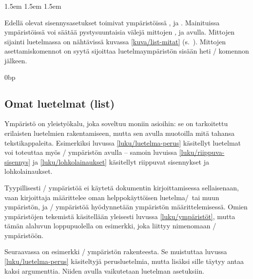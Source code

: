 \begin{koodilohkosis}
\setlength{\leftmargini}  {1.5em} %
\setlength{\leftmarginii} {1.5em}
\setlength{\leftmarginiii}{1.5em}
\setlength{\leftmarginiv} {1.5em}
\end{koodilohkosis}

\noindent
Edellä olevat sisennysasetukset toimivat ympäristöissä
,  ja .
Mainituissa ympäristöissä voi säätää pystysuuntaisia välejä mittojen
,  ja  avulla. Mittojen
sijainti luetelmassa on nähtävissä kuvassa \ref{kuva/list-mitat}
(s.~\pageref{kuva/list-mitat}). Mittojen asettamiskomennot on syytä
sijoittaa luetelmaympäristön sisään heti \-/ komennon
jälkeen.

\begin{koodilohkosis}
\setlength{\parsep} {0bp}   %
\setlength{\itemsep}{3bp}   %
\setlength{\parskip}{1.2ex} %
\end{koodilohkosis}

\subsection{Omat luetelmat (list)}
\label{luku/list-ympäristö}

Ympäristö  on yleistyökalu, joka soveltuu moniin
asioihin: se on tarkoitettu erilaisten luetelmien rakentamiseen, mutta
sen avulla muotoilla mitä tahansa tekstikappaleita. Esimerkiksi luvussa
\ref{luku/luetelma-perus} käsitellyt luetelmat voi toteuttaa myös
\-/ ympäristön avulla -- samoin luvuissa
\ref{luku/riippuva-sisennys} ja \ref{luku/lohkolainaukset} käsitellyt
riippuvat sisennykset ja lohkolainaukset.

Tyypillisesti \-/ ympäristöä ei käytetä dokumentin
kirjoittamisessa sellaisenaan, vaan kirjoittaja määrittelee oman
helppokäyttöisen luetelma\-/\ tai muun ympäristön, ja
\-/ ympäristöä hyödynnetään ympäristön
määrittelemisessä. Omien ympäristöjen tekemistä käsitellään yleisesti
luvussa \ref{luku/ympäristöt}, mutta tämän alaluvun loppupuolella on
esimerkki, joka liittyy nimenomaan \-/ ympäristöön.

Seuraavassa on esimerkki \-/ ympäristön rakenteesta. Se
muistuttaa luvussa \ref{luku/luetelma-perus} käsiteltyjä perusluetelmia,
mutta lisäksi sille täytyy antaa kaksi argumenttia. Niiden avulla
vaikutetaan luetelman asetuksiin.

